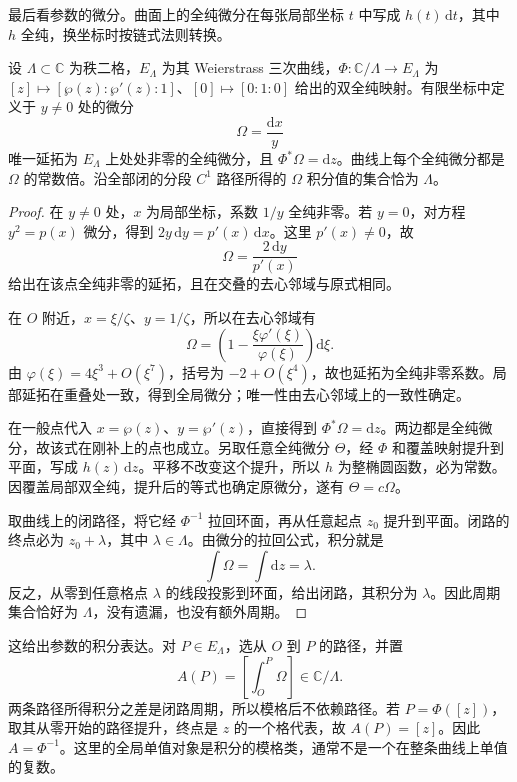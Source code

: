 \ProseParagraphBreak

最后看参数的微分。曲面上的全纯微分在每张局部坐标 \(t\) 中写成 \(h(t)\,\mathrm dt\)，其中 \(h\) 全纯，换坐标时按链式法则转换。

\begin{proposition}[无零微分与周期]\label{b3:prop:22-differential-periods}
设 \(\Lambda\subset\mathbb C\) 为秩二格，\(E_\Lambda\) 为其 Weierstrass 三次曲线，\(\Phi:\mathbb C/\Lambda\to E_\Lambda\) 为 \([z]\mapsto[\wp(z):\wp'(z):1]\)、\([0]\mapsto[0:1:0]\) 给出的双全纯映射。有限坐标中定义于 \(y\ne0\) 处的微分
\[
 \Omega=\frac{\mathrm dx}{y}
\]
唯一延拓为 \(E_\Lambda\) 上处处非零的全纯微分，且 \(\Phi^*\Omega=\mathrm dz\)。曲线上每个全纯微分都是 \(\Omega\) 的常数倍。沿全部闭的分段 \(C^1\) 路径所得的 \(\Omega\) 积分值的集合恰为 \(\Lambda\)。
\end{proposition}
\begin{proof}
在 \(y\ne0\) 处，\(x\) 为局部坐标，系数 \(1/y\) 全纯非零。若 \(y=0\)，对方程 \(y^2=p(x)\) 微分，得到 \(2y\,\mathrm dy=p'(x)\,\mathrm dx\)。这里 \(p'(x)\ne0\)，故
\[
 \Omega=\frac{2\,\mathrm dy}{p'(x)}
\]
给出在该点全纯非零的延拓，且在交叠的去心邻域与原式相同。

在 \(O\) 附近，\(x=\xi/\zeta\)、\(y=1/\zeta\)，所以在去心邻域有
\[
 \Omega=\left(1-\frac{\xi\varphi'(\xi)}{\varphi(\xi)}\right)\mathrm d\xi.
\]
由 \(\varphi(\xi)=4\xi^3+O(\xi^7)\)，括号为 \(-2+O(\xi^4)\)，故也延拓为全纯非零系数。局部延拓在重叠处一致，得到全局微分；唯一性由去心邻域上的一致性确定。

在一般点代入 \(x=\wp(z)\)、\(y=\wp'(z)\)，直接得到 \(\Phi^*\Omega=\mathrm dz\)。两边都是全纯微分，故该式在刚补上的点也成立。另取任意全纯微分 \(\Theta\)，经 \(\Phi\) 和覆盖映射提升到平面，写成 \(h(z)\,\mathrm dz\)。平移不改变这个提升，所以 \(h\) 为整椭圆函数，必为常数。因覆盖局部双全纯，提升后的等式也确定原微分，遂有 \(\Theta=c\Omega\)。

取曲线上的闭路径，将它经 \(\Phi^{-1}\) 拉回环面，再从任意起点 \(z_0\) 提升到平面。闭路的终点必为 \(z_0+\lambda\)，其中 \(\lambda\in\Lambda\)。由微分的拉回公式，积分就是
\[
 \int\Omega=\int\mathrm dz=\lambda.
\]
反之，从零到任意格点 \(\lambda\) 的线段投影到环面，给出闭路，其积分为 \(\lambda\)。因此周期集合恰好为 \(\Lambda\)，没有遗漏，也没有额外周期。
\end{proof}

这给出参数的积分表达。对 \(P\in E_\Lambda\)，选从 \(O\) 到 \(P\) 的路径，并置
\begin{equation}\label{b3:eq:22-abel-inverse}
 A(P)=\left[\int_O^P\Omega\right]\in\mathbb C/\Lambda.
\end{equation}
两条路径所得积分之差是闭路周期，所以模格后不依赖路径。若 \(P=\Phi([z])\)，取其从零开始的路径提升，终点是 \(z\) 的一个格代表，故 \(A(P)=[z]\)。因此 \(A=\Phi^{-1}\)。这里的全局单值对象是积分的模格类，通常不是一个在整条曲线上单值的复数。

